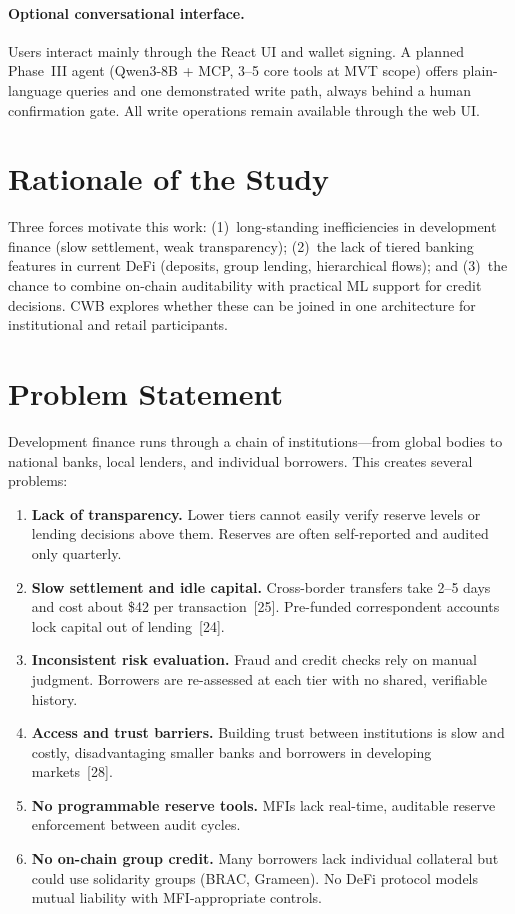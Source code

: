 \documentclass[12pt,a4paper]{report}
\begin{document}
\paragraph{Optional conversational interface.}
Users interact mainly through the React UI and wallet signing. A planned Phase~III agent (Qwen3-8B + MCP, 3--5 core tools at MVT scope) offers plain-language queries and one demonstrated write path, always behind a human confirmation gate. All write operations remain available through the web UI.

\section{Rationale of the Study}
\label{sec:rationale}

Three forces motivate this work: (1)~long-standing inefficiencies in development finance (slow settlement, weak transparency); (2)~the lack of tiered banking features in current DeFi (deposits, group lending, hierarchical flows); and (3)~the chance to combine on-chain auditability with practical ML support for credit decisions. CWB explores whether these can be joined in one architecture for institutional and retail participants.

\section{Problem Statement}
\label{sec:problem-statement}

Development finance runs through a chain of institutions---from global bodies to national banks, local lenders, and individual borrowers. This creates several problems:

\begin{enumerate}[noitemsep]
\item \textbf{Lack of transparency.} Lower tiers cannot easily verify reserve levels or lending decisions above them. Reserves are often self-reported and audited only quarterly.

\item \textbf{Slow settlement and idle capital.} Cross-border transfers take 2--5 days and cost about \$42 per transaction~[25]. Pre-funded correspondent accounts lock capital out of lending~[24].

\item \textbf{Inconsistent risk evaluation.} Fraud and credit checks rely on manual judgment. Borrowers are re-assessed at each tier with no shared, verifiable history.

\item \textbf{Access and trust barriers.} Building trust between institutions is slow and costly, disadvantaging smaller banks and borrowers in developing markets~[28].

\item \textbf{No programmable reserve tools.} MFIs lack real-time, auditable reserve enforcement between audit cycles.

\item \textbf{No on-chain group credit.} Many borrowers lack individual collateral but could use solidarity groups (BRAC, Grameen). No DeFi protocol models mutual liability with MFI-appropriate controls.
\end{enumerate}
\end{document}
